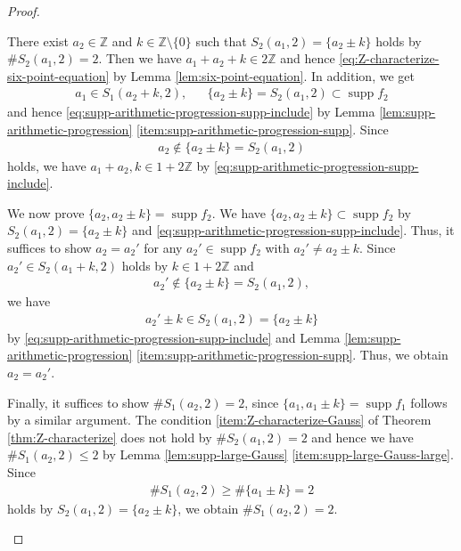 \documentclass[12pt]{article}
\theoremstyle{definition}
\theoremstyle{remark}
\numberwithin{equation}{section}
\numberwithin{figure}{section}
\numberwithin{table}{section}
\DeclareMathOperator{\supp}{supp}
\begin{document}
\begin{proof}
\begin{enumerate}
There exist $ a_2 \in \mathbb{ Z } $ and $ k \in \mathbb{ Z } \setminus \{ 0 \} $ such that $ S_2 ( a_1 , 2 ) = \{ a_2 \pm k \} $ holds by $ \# S_2 ( a_1 , 2 ) = 2 $.
Then we have $ a_1 + a_2 + k \in 2 \mathbb{ Z } $ and hence \eqref{eq:Z-characterize-six-point-equation} by Lemma \ref{lem:six-point-equation}.
In addition, we get
\begin{align}
    a_1 \in S_1 ( a_2 + k , 2 ), & &\{ a_2 \pm k \} = S_2 ( a_1 , 2 ) \subset \supp f_2
\end{align}
and hence \eqref{eq:supp-arithmetic-progression-supp-include} by Lemma \ref{lem:supp-arithmetic-progression} \ref{item:supp-arithmetic-progression-supp}.
Since
\begin{align}
    a_2 \notin \{ a_2 \pm k \} = S_2 ( a_1 , 2 )
\end{align}
holds, we have $ a_1 + a_2 , k \in 1 + 2 \mathbb{ Z } $ by \eqref{eq:supp-arithmetic-progression-supp-include}.

We now prove $ \{ a_2 , a_2 \pm k \} = \supp f_2 $.
We have $ \{ a_2 , a_2 \pm k \} \subset \supp f_2 $ by $ S_2 ( a_1 , 2 ) = \{ a_2 \pm k \} $ and \eqref{eq:supp-arithmetic-progression-supp-include}.
Thus, it suffices to show $ a_2 = a_2' $ for any $ a_2' \in \supp f_2 $ with $ a_2' \neq a_2 \pm k $.
Since $ a_2' \in S_2 ( a_1 + k , 2 ) $ holds by $ k \in 1 + 2 \mathbb{ Z } $ and 
\begin{align}
    a_2' \notin \{ a_2 \pm k \} = S_2 ( a_1 , 2 ),
\end{align}
we have
\begin{align}
    a_2' \pm k \in S_2 ( a_1 , 2 ) = \{ a_2 \pm k \}
\end{align}
by \eqref{eq:supp-arithmetic-progression-supp-include} and Lemma \ref{lem:supp-arithmetic-progression} \ref{item:supp-arithmetic-progression-supp}.
Thus, we obtain $ a_2 = a_2' $.

Finally, it suffices to show $ \# S_1 ( a_2 , 2 ) = 2 $, since $ \{ a_1 , a_1 \pm k \} = \supp f_1 $ follows by a similar argument.
The condition \ref{item:Z-characterize-Gauss} of Theorem \ref{thm:Z-characterize} does not hold by $ \# S_2 ( a_1 , 2 ) = 2 $ and hence we have $ \# S_1 ( a_2 , 2 ) \leq 2 $ by Lemma \ref{lem:supp-large-Gauss} \ref{item:supp-large-Gauss-large}.
Since
\begin{align}
   \# S_1 ( a_2 , 2 ) \geq \# \{ a_1 \pm k \} = 2 
\end{align}
holds by $ S_2 ( a_1 , 2 ) = \{ a_2 \pm k \} $, we obtain $ \# S_1 ( a_2 , 2 ) = 2 $.
\qedhere

\end{enumerate}

\end{proof}
\end{document}
